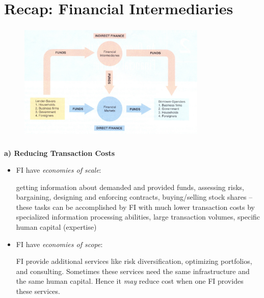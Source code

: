 \documentclass[11pt]{beamer}
\begin{document}
\begin{frame}
	\begin{center}
	\end{center}
\end{frame}


%
\section{Recap: Financial Intermediaries}
%
\begin{frame}
	\frametitle{\insertsection}
	\begin{figure}[h]
		 \includegraphics[width=0.8\textwidth]{Figures/intermediates.eps}
	\end{figure}
\end{frame}


\begin{frame}
\frametitle{\insertsection}
\textbf{a) Reducing Transaction Costs}
\begin{itemize}
\item FI have \textit{economies of scale}:
\par\smallskip
getting information about demanded and provided funds, assessing risks, bargaining, designing and enforcing contracts, buying/selling stock shares -- these tasks can be accomplished by FI with much lower transaction costs by specialized information processing abilities, large transaction volumes, specific human capital (expertise)
\item FI have \textit{economies of scope}:
\par\smallskip
FI provide additional services like risk diversification, optimizing portfolios, and consulting. Sometimes these services need the same infrastructure and the same human capital. Hence it \textit{may} reduce cost when one FI provides these services.
\end{itemize}
\end{frame}
\end{document}
